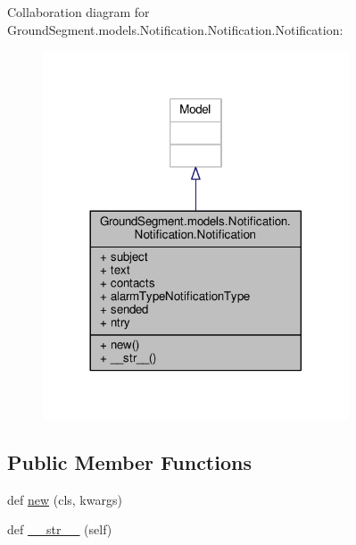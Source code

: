 Collaboration diagram for Ground\+Segment.\+models.\+Notification.\+Notification.\+Notification\+:\nopagebreak
\begin{figure}[H]
\begin{center}
\leavevmode
\includegraphics[width=257pt]{class_ground_segment_1_1models_1_1_notification_1_1_notification_1_1_notification__coll__graph}
\end{center}
\end{figure}
\subsection*{Public Member Functions}
\begin{DoxyCompactItemize}
\item 
def \hyperlink{class_ground_segment_1_1models_1_1_notification_1_1_notification_1_1_notification_ad9be3de0a1aef79bd4828cf5f3db8973}{new} (cls, kwargs)
\item 
def \hyperlink{class_ground_segment_1_1models_1_1_notification_1_1_notification_1_1_notification_aa9325e10b792980bc5670b3c250c0234}{\+\_\+\+\_\+str\+\_\+\+\_\+} (self)
\end{DoxyCompactItemize}
